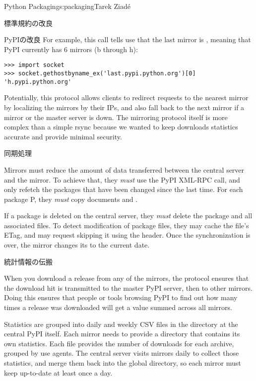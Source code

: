 \begin{aosachapter}{Python Packaging}{s:packaging}{Tarek Ziad\'{e}}
\begin{aosasect1}{標準規約の改良}
\begin{aosasect2}{PyPIの改良}
For example, this call tells use that the last mirror is
, meaning that PyPI currently has 6 mirrors (b
through h):

\begin{verbatim}
>>> import socket
>>> socket.gethostbyname_ex('last.pypi.python.org')[0]
'h.pypi.python.org'
\end{verbatim}

\noindent Potentially, this protocol allows clients to redirect requests to the
nearest mirror by localizing the mirrors by their IPs, and also fall
back to the next mirror if a mirror or the master server is down.  The
mirroring protocol itself is more complex than a simple rsync because
we wanted to keep downloads statistics accurate and provide minimal
security.

\begin{aosasect3}{同期処理}

Mirrors must reduce the amount of data transferred between the central
server and the mirror. To achieve that, they \emph{must} use the
 PyPI XML-RPC call, and only refetch the packages that
have been changed since the last time.  For each package P, they
\emph{must} copy documents  and .

If a package is deleted on the central server, they \emph{must} delete
the package and all associated files. To detect modification of
package files, they may cache the file's ETag, and may request
skipping it using the  header.  Once the
synchronization is over, the mirror changes its 
to the current date.

\end{aosasect3}

\begin{aosasect3}{統計情報の伝搬}

When you download a release from any of the mirrors, the protocol
ensures that the download hit is transmitted to the master PyPI
server, then to other mirrors.  Doing this ensures that people or
tools browsing PyPI to find out how many times a release was downloaded
will get a value summed across all mirrors.

Statistics are grouped into daily and weekly CSV files in the
 directory at the central PyPI itself.  Each mirror needs
to provide a  directory that contains its own
statistics. Each file provides the number of downloads for each
archive, grouped by use agents.  The central server visits mirrors
daily to collect those statistics, and merge them back into the global
 directory, so each mirror must keep 
up-to-date at least once a day.


\end{aosasect3}
\end{aosasect2}
\end{aosasect1}
\end{aosachapter}
